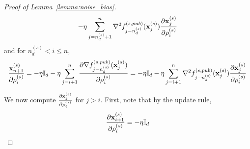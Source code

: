 \begin{proof}[Proof of Lemma~\ref{lemma:noise_bias}]
\begin{align}
        - \eta \sum_{j=n_d^{(s)}+1}^{n} \nabla^2 f_{j-n_d^{(s)}}^{(s, pub)}({\mathbf{x}}_j^{(s)}) \frac{\partial {\mathbf{x}}_j^{(s)}}{\partial \rho_i^{(s)}}
    \end{align}
    and for $n_d^{(s)} < i \leq n$,
    \begin{align}
    \label{eq:partial_x_n1_large_i}
    \frac{{\mathbf{x}}_{n+1}^{(s)}}{\partial \rho_i^{(s)}}
        = -\eta {\mathbb{I}}_d - \eta \sum_{j=i+1}^{n}\frac{\partial \nabla f_{j-n_d^{(s)}}^{(s, pub)}({\mathbf{x}}_j^{(s)})}{\partial \rho_i^{(s)}}
        = -\eta {\mathbb{I}}_d - \eta \sum_{j=i+1}^{n} \nabla^2 f_{j-n_d^{(s)}}^{(s, pub)}({\mathbf{x}}_j^{(s)}) \frac{\partial {\mathbf{x}}_j^{(s)}}{\partial \rho_i^{(s)}}
    \end{align}

    We now compute $\frac{\partial {\mathbf{x}}_j^{(s)}}{\partial \rho_i^{(s)}}$ for $j > i$. First, note that by the update rule, 
    \begin{align}
    \label{eq:partial_x_i1}
        \frac{\partial {\mathbf{x}}_{i+1}^{(s)}}{\partial \rho_i^{(s)}}
    = -\eta {\mathbb{I}}_d
    \end{align}
    

\end{proof}

